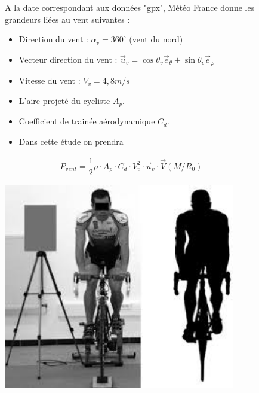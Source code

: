 \begin{figure}[!htb]
\begin{minipage}{0.5\textwidth}
A la date correspondant aux données "gpx", Météo France donne les grandeurs liées au vent suivantes :
\begin{itemize}
\item Direction du vent : $\alpha_v=360^{\circ}$ (vent du nord)
\item Vecteur direction du vent : $\overrightarrow{u}_v=\cos\theta_v\overrightarrow{e}_{\theta}+\sin\theta_v\overrightarrow{e}_{\varphi}$
\item Vitesse du vent : $V_v=4,8m/s$
\item L'aire projeté du cycliste $A_p$.
\item Coefficient de trainée aérodynamique $C_d$.
\item Dans cette étude on prendra 
\end{itemize}

\begin{align*}
P_{vent}=\dfrac{1}{2}\rho\cdot A_p\cdot C_d\cdot V_v^2\cdot \overrightarrow{u}_v\cdot \overrightarrow{V}(M/R_0)
\end{align*}
\end{minipage}
\begin{minipage}{0.5\textwidth}
\begin{center}
\includegraphics[width=0.9\textwidth]{aire_projetee.jpg}
\end{center}
\end{minipage}
\end{figure}


